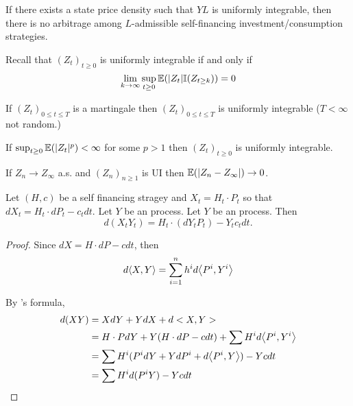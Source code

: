 \begin{thm}
  \label{defn:continuous_time:23}
  If there exists a state price density such that $YL$ is uniformly
  integrable, then there is no arbitrage among $L$-admissible
  self-financing investment/consumption strategies.
\end{thm}

\begin{remark}
  Recall that $(Z_{t})_{t \geq 0}$ is uniformly integrable if and only
  if
  \begin{equation}
    \label{eq:59}
    \lim_{k \rightarrow \infty} \sup_{t \geq 0} \E{|Z_{t}|\I{Z_{t \geq
        k}}} = 0
  \end{equation}
\end{remark}

\begin{remark}
  If $(Z_{t})_{0 \leq t \leq T}$ is a martingale then $(Z_{t})_{0 \leq t
  \leq T}$ is uniformly integrable ($T < \infty$ not random.)
\end{remark}

\begin{remark}
  If $\sup_{t \geq 0} \E{|Z_{t}|^{p}} < \infty$ for some $p > 1$ then
  $(Z_{t})_{t \geq 0}$ is uniformly integrable.
\end{remark}

\begin{remark}
  If $Z_{n} \rightarrow Z_{\infty}$ a.s. and $(Z_{n})_{n \geq 1}$ is
  UI then $\E{|Z_{n} - Z_{\infty}|} \rightarrow 0$.
\end{remark}

\begin{proposition}
  Let $(H, c)$ be a self financing stragey and $X_{t} = H_{t} \cdot
  P_{t}$ so that $dX_{t} = H_{t} \cdot dP_{t} - c_{t} dt$.  Let $Y$ be
  an \ito process.  Let $Y$ be an \ito process.  Then
  \begin{equation}
    \label{eq:60}
    d(X_{t} Y_{t} ) = H_{t} \cdot (dY_{t}P_{t}) - Y_{t} c_{t} dt.
  \end{equation}
\end{proposition}

\begin{proof}
  Since $dX = H \cdot dP - c dt$, then
  \begin{align}
    \label{eq:61}
    d \IP{ X, Y } = \sum_{i=1}^{n} h^{i} d \IP{P^{i}, Y^{i}}
  \end{align}

  By \ito's formula,
  \begin{align}
    \label{eq:62}
    d(XY) &= XdY + YdX + d<X, Y>  \\
    &= H \cdot P dY + Y(H \cdot dP - c dt) + \sum H^{i} d \IP{P^{i},
      Y^{i}} \\
    &= \sum H^{i}(P^{i} dY + Y dP^{i} + d \IP{ P^{i}, Y }) -
    Y c dt \\
    &= \sum H^{i} d(P^{i} Y) - Yc dt
  \end{align}
\end{proof}

